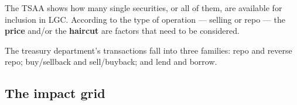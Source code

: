 
\begin{lrdefbox}
The TSAA shows how many single securities, or all of them, are available for inclusion in LGC. According to the type of operation --- selling or repo --- the \textbf{price} and/or the \textbf{haircut} are factors that need to be considered.
\end{lrdefbox}

The treasury department's transactions fall into three families: repo and reverse repo; buy/sellback and sell/buyback; and lend and borrow.

\subsection{The impact grid}

